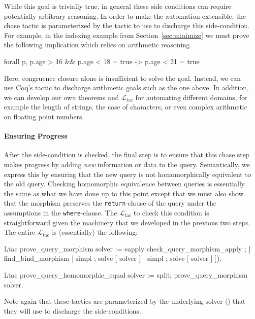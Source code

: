 \documentclass[preprint]{sigplanconf}
\newcommand{\WHERE}{{\tt where} \ }
\newcommand{\RETURN}{{\tt return} \ }
\newcommand{\ltac}[0]{\ensuremath{\mathcal{L}_{\mathrm{tac}}}}
\begin{document}
While this goal is trivially true, in general these side conditions can require potentially arbitrary reasoning.
In order to make the automation extensible, the chase tactic is parameterized by the tactic to use to discharge this side-condition.
For example, in the indexing example from Section~\ref{sec:minimize} we must prove the following implication which relies on arithmetic reasoning.
\begin{coq}
forall p, p.age > 16 && p.age < 18 = true ->
          p.age < 21 = true
\end{coq}
Here, congruence closure alone is insufficient to solve the goal.
Instead, we can use Coq's  tactic to discharge arithmetic goals such as the one above.
In addition, we can develop our own theorems and \ltac{} for automating different domains, for example the length of strings, the case of characters, or even complex arithmetic on floating point numbers.

\paragraph{Ensuring Progress}
After the side-condition is checked, the final step is to ensure that this chase step makes progress by adding \emph{new} information or data to the query.
Semantically, we express this by ensuring that the new query is not homomorphically equivalent to the old query.
Checking homomorphic equivalence between queries is essentially the same as what we have done up to this point except that we must also show that the morphism preserves the {\tt return}-clause of the query under the assumptions in the {\tt where}-clause.
The \ltac{} to check this condition is straightforward given the machinery that we developed in the previous two steps.
The entire \ltac{} is (essentially) the following:
\begin{coq}
Ltac prove_query_morphism solver :=
  eapply check_query_morphism_apply ;
    [ find_bind_morphism
    | simpl ; solve [ solver ]
    | simpl ; solve [ solver ] ]).

Ltac prove_query_homomorphic_equal solver :=
  split; prove_query_morphism solver.
\end{coq}
Note again that these tactics are parameterized by the underlying solver () that they will use to discharge the side-conditions.
\end{document}
